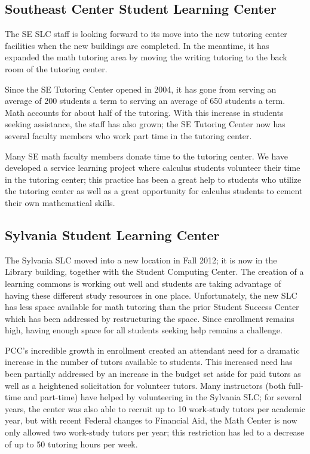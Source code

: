 \subsection{Southeast Center Student Learning Center}
The SE SLC staff is looking forward to its move into the new tutoring center
facilities when the new buildings are completed. In the meantime, it has
expanded the math tutoring area by moving the writing tutoring to the back room
of the tutoring center.  

Since the SE Tutoring Center opened in 2004, it has gone from serving an
average of 200 students a term to serving an average of 650 students a term.
Math accounts for about half of the tutoring.  With this increase in students
seeking assistance, the staff has also grown; the SE Tutoring Center now has several faculty
members who work part time in the tutoring center. 

Many SE math faculty members donate time to the tutoring center. We have
developed a service learning project where calculus students volunteer their
time in the tutoring center; this practice has been a great help to
students who utilize the tutoring center as well as a great opportunity for
calculus students to cement their own mathematical skills.

\subsection{Sylvania Student Learning Center}
The Sylvania SLC moved into a new location in Fall 2012; it is now in
the Library building, together with the Student Computing Center. The creation
of a learning commons is working out well and students are taking advantage of
having these different study resources in one place. Unfortunately, the new SLC
has less space available for math tutoring than the prior Student Success Center
which has been addressed by restructuring the space. Since enrollment remains high, having enough space
for all students seeking help remains a challenge.

PCC's incredible growth in enrollment created an attendant need for a dramatic
increase in the number of tutors available to students. This increased need has
been partially addressed by an increase in the budget set aside for paid tutors
as well as a heightened solicitation for volunteer tutors. Many
instructors (both full-time and part-time) have helped by volunteering in the
Sylvania SLC; for several years, the center was also able to recruit up to 10
work-study tutors per academic year, but with recent Federal changes to
Financial Aid, the Math Center is now only allowed two work-study tutors per
year; this restriction has led to a decrease of up to 50 tutoring hours per
week.

